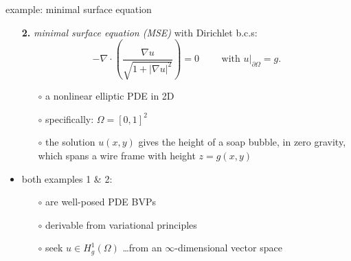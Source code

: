 \documentclass[hide notes,intlimits,usenames,dvipsnames]{beamer}
\newcommand{\grad}{\nabla}
\begin{document}
\begin{frame}{example: minimal surface equation}

\begin{itemize}
\item[\textbf{2.}] \emph{minimal surface equation (MSE)} with Dirichlet b.c.s:
	    $$- \grad\cdot \left(\frac{\grad u}{\sqrt{1 + |\grad u|^2}}\right) = 0  \qquad \text{ with } u\big|_{\partial \Omega} = g.$$
    \vspace{-2mm}
	\begin{itemize}
	\item[$\circ$] a nonlinear elliptic PDE in 2D
	\item[$\circ$] specifically: $\Omega = [0,1]^2$
	\item[$\circ$] the solution $u(x,y)$ gives the height of a soap bubble, in zero gravity, which spans a wire frame with height $z=g(x,y)$
	\end{itemize}

\begin{center}
\end{center}

\item both examples 1 \& 2:
	\begin{itemize}
	\item[$\circ$] are well-posed PDE BVPs
	\item[$\circ$] derivable from variational principles
	\item[$\circ$] seek $u \in H_g^1(\Omega)$ \dots from an \alert{$\infty$-dimensional vector space}
	\end{itemize}
\end{itemize}
\end{frame}
\end{document}
